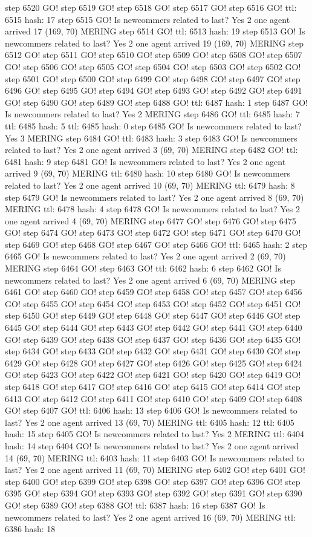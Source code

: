 step 6520 GO! step 6519 GO! step 6518 GO! step 6517 GO! step 6516 GO! ttl: 6515 hash: 17 step 6515 GO! Is newcommers related to last? Yes 2 one agent arrived 17 (169, 70) MERING step 6514 GO! ttl: 6513 hash: 19 step 6513 GO! Is newcommers related to last? Yes 2 one agent arrived 19 (169, 70) MERING step 6512 GO! step 6511 GO! step 6510 GO! step 6509 GO! step 6508 GO! step 6507 GO! step 6506 GO! step 6505 GO! step 6504 GO! step 6503 GO! step 6502 GO! step 6501 GO! step 6500 GO! step 6499 GO! step 6498 GO! step 6497 GO! step 6496 GO! step 6495 GO! step 6494 GO! step 6493 GO! step 6492 GO! step 6491 GO! step 6490 GO! step 6489 GO! step 6488 GO! ttl: 6487 hash: 1 step 6487 GO! Is newcommers related to last? Yes 2 MERING step 6486 GO! ttl: 6485 hash: 7 ttl: 6485 hash: 5 ttl: 6485 hash: 0 step 6485 GO! Is newcommers related to last? Yes 3 MERING step 6484 GO! ttl: 6483 hash: 3 step 6483 GO! Is newcommers related to last? Yes 2 one agent arrived 3 (69, 70) MERING step 6482 GO! ttl: 6481 hash: 9 step 6481 GO! Is newcommers related to last? Yes 2 one agent arrived 9 (69, 70) MERING ttl: 6480 hash: 10 step 6480 GO! Is newcommers related to last? Yes 2 one agent arrived 10 (69, 70) MERING ttl: 6479 hash: 8 step 6479 GO! Is newcommers related to last? Yes 2 one agent arrived 8 (69, 70) MERING ttl: 6478 hash: 4 step 6478 GO! Is newcommers related to last? Yes 2 one agent arrived 4 (69, 70) MERING step 6477 GO! step 6476 GO! step 6475 GO! step 6474 GO! step 6473 GO! step 6472 GO! step 6471 GO! step 6470 GO! step 6469 GO! step 6468 GO! step 6467 GO! step 6466 GO! ttl: 6465 hash: 2 step 6465 GO! Is newcommers related to last? Yes 2 one agent arrived 2 (69, 70) MERING step 6464 GO! step 6463 GO! ttl: 6462 hash: 6 step 6462 GO! Is newcommers related to last? Yes 2 one agent arrived 6 (69, 70) MERING step 6461 GO! step 6460 GO! step 6459 GO! step 6458 GO! step 6457 GO! step 6456 GO! step 6455 GO! step 6454 GO! step 6453 GO! step 6452 GO! step 6451 GO! step 6450 GO! step 6449 GO! step 6448 GO! step 6447 GO! step 6446 GO! step 6445 GO! step 6444 GO! step 6443 GO! step 6442 GO! step 6441 GO! step 6440 GO! step 6439 GO! step 6438 GO! step 6437 GO! step 6436 GO! step 6435 GO! step 6434 GO! step 6433 GO! step 6432 GO! step 6431 GO! step 6430 GO! step 6429 GO! step 6428 GO! step 6427 GO! step 6426 GO! step 6425 GO! step 6424 GO! step 6423 GO! step 6422 GO! step 6421 GO! step 6420 GO! step 6419 GO! step 6418 GO! step 6417 GO! step 6416 GO! step 6415 GO! step 6414 GO! step 6413 GO! step 6412 GO! step 6411 GO! step 6410 GO! step 6409 GO! step 6408 GO! step 6407 GO! ttl: 6406 hash: 13 step 6406 GO! Is newcommers related to last? Yes 2 one agent arrived 13 (69, 70) MERING ttl: 6405 hash: 12 ttl: 6405 hash: 15 step 6405 GO! Is newcommers related to last? Yes 2 MERING ttl: 6404 hash: 14 step 6404 GO! Is newcommers related to last? Yes 2 one agent arrived 14 (69, 70) MERING ttl: 6403 hash: 11 step 6403 GO! Is newcommers related to last? Yes 2 one agent arrived 11 (69, 70) MERING step 6402 GO! step 6401 GO! step 6400 GO! step 6399 GO! step 6398 GO! step 6397 GO! step 6396 GO! step 6395 GO! step 6394 GO! step 6393 GO! step 6392 GO! step 6391 GO! step 6390 GO! step 6389 GO! step 6388 GO! ttl: 6387 hash: 16 step 6387 GO! Is newcommers related to last? Yes 2 one agent arrived 16 (69, 70) MERING ttl: 6386 hash: 18 